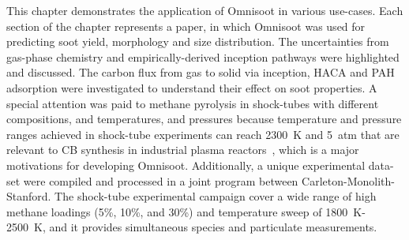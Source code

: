This chapter demonstrates the application of Omnisoot in various use-cases. Each section of the chapter represents a paper, in which Omnisoot was used for predicting soot yield, morphology and size distribution. The uncertainties from gas-phase chemistry and empirically-derived inception pathways were highlighted and discussed. The carbon flux from gas to solid via inception, HACA and PAH adsorption were investigated to understand their effect on soot properties. A special attention was paid to methane pyrolysis in shock-tubes with different compositions, and temperatures, and pressures because temperature and pressure ranges achieved in shock-tube experiments can reach 2300~K and 5~atm that are relevant to CB synthesis in industrial plasma reactors~\citep{fulcheri2023energy}, which is a major motivations for developing Omnisoot. Additionally, a unique experimental data-set were compiled and processed in a joint program between Carleton-Monolith-Stanford. The shock-tube experimental campaign cover a wide range of high methane loadings (5\%, 10\%, and 30\%) and temperature sweep of 1800~K-2500~K, and it provides simultaneous species and particulate measurements. 



